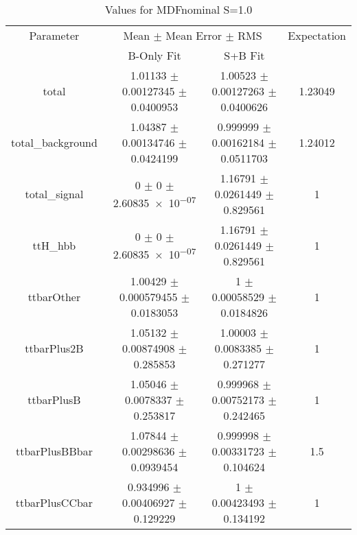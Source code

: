 \begin{table}
\centering
\caption{Values for MDFnominal S=1.0}
\begin{tabular}{cccc}
\toprule
Parameter & \multicolumn{2}{c}{Mean $\pm$ Mean Error $\pm$ RMS} & Expectation\\
 & B-Only Fit & S+B Fit & \\
\midrule
total & \num{1.01133} $\pm$ \num{0.00127345} $\pm$ \num{0.0400953} & \num{1.00523} $\pm$ \num{0.00127263} $\pm$ \num{0.0400626} & \num{1.23049}\\
total\_background & \num{1.04387} $\pm$ \num{0.00134746} $\pm$ \num{0.0424199} & \num{0.999999} $\pm$ \num{0.00162184} $\pm$ \num{0.0511703} & \num{1.24012}\\
total\_signal & \num{0} $\pm$ \num{0} $\pm$ \num{2.60835e-07} & \num{1.16791} $\pm$ \num{0.0261449} $\pm$ \num{0.829561} & \num{1}\\
ttH\_hbb & \num{0} $\pm$ \num{0} $\pm$ \num{2.60835e-07} & \num{1.16791} $\pm$ \num{0.0261449} $\pm$ \num{0.829561} & \num{1}\\
ttbarOther & \num{1.00429} $\pm$ \num{0.000579455} $\pm$ \num{0.0183053} & \num{1} $\pm$ \num{0.00058529} $\pm$ \num{0.0184826} & \num{1}\\
ttbarPlus2B & \num{1.05132} $\pm$ \num{0.00874908} $\pm$ \num{0.285853} & \num{1.00003} $\pm$ \num{0.0083385} $\pm$ \num{0.271277} & \num{1}\\
ttbarPlusB & \num{1.05046} $\pm$ \num{0.0078337} $\pm$ \num{0.253817} & \num{0.999968} $\pm$ \num{0.00752173} $\pm$ \num{0.242465} & \num{1}\\
ttbarPlusBBbar & \num{1.07844} $\pm$ \num{0.00298636} $\pm$ \num{0.0939454} & \num{0.999998} $\pm$ \num{0.00331723} $\pm$ \num{0.104624} & \num{1.5}\\
ttbarPlusCCbar & \num{0.934996} $\pm$ \num{0.00406927} $\pm$ \num{0.129229} & \num{1} $\pm$ \num{0.00423493} $\pm$ \num{0.134192} & \num{1}\\
\bottomrule
\end{tabular}
\end{table}